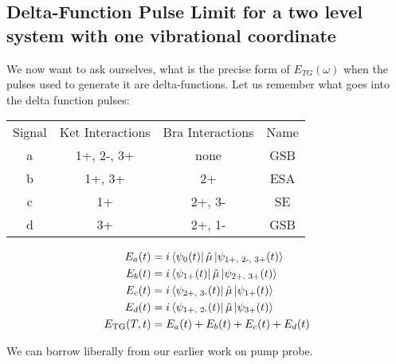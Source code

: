 \subsection{Delta-Function Pulse Limit for a two level system with one vibrational coordinate}
We now want to ask ourselves, what is the precise form of $E_{TG} (\omega)$ when the pulses used to generate it are delta-functions.  Let us remember what goes into the delta function pulses:
\begin{tabular}{cccc}
Signal & Ket Interactions & Bra Interactions & Name \\
a & 1+, 2-, 3+ & none & GSB\\
b & 1+, 3+ & 2+ & ESA \\
c & 1+ & 2+, 3- & SE \\
d & 3+ & 2+, 1- & GSB
\end{tabular}
\begin{align}
	E_a (t) &=  i \bra{\psi_{0} (t)} \hat{\mu} \ket{\psi_{\text{1+, 2-, 3+}} (t)}\\
	E_b (t) &=  i \bra{\psi_{\text{1+}} (t)} \hat{\mu} \ket{\psi_{\text{2+, 3+}} (t)}\\
	E_c (t) &=  i \bra{\psi_{\text{2+, 3-}} (t)} \hat{\mu} \ket{\psi_{\text{1+}} (t)}\\
	E_d (t) &=  i \bra{\psi_{\text{1+, 2-}} (t)} \hat{\mu} \ket{\psi_{\text{3+}} (t)} \\
	E_{\text{TG}} (T, t) &= E_a (t)  + E_b (t)  + E_c (t)  + E_d (t)
\end{align}

We can borrow liberally from our earlier work on pump probe.

